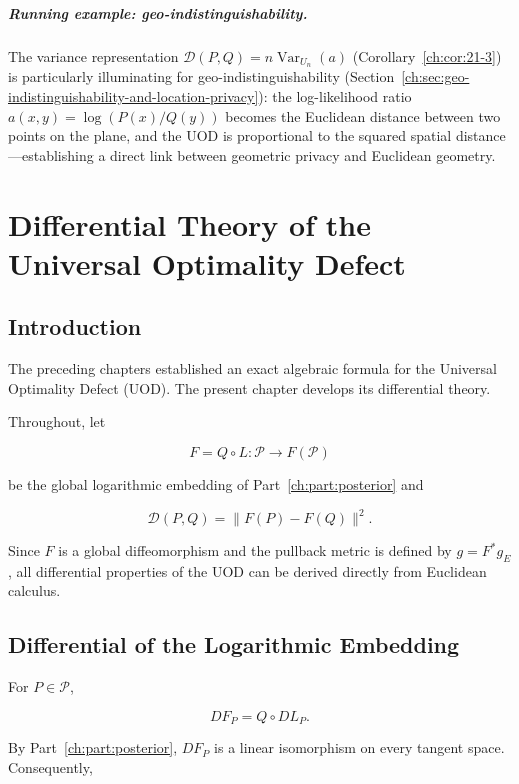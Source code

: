 \paragraph{Running example: geo-indistinguishability.}
The variance representation $\mathcal D(P,Q)=n\operatorname{Var}_{U_n}(a)$ (Corollary~\ref{ch:cor:21-3}) is particularly illuminating for geo-indistinguishability (Section~\ref{ch:sec:geo-indistinguishability-and-location-privacy}): the log-likelihood ratio $a(x,y)=\log(P(x)/Q(y))$ becomes the Euclidean distance between two points on the plane, and the UOD is proportional to the squared spatial distance---establishing a direct link between geometric privacy and Euclidean geometry.

\chapter[Differential Theory of the UOD]{Differential Theory of the Universal Optimality Defect}\label{ch:sec:differential-theory-of-the-universal-optimality-defect}

\section{Introduction}\label{ch:sec:introduction-analytic_uod-3}

The preceding chapters established an exact algebraic formula for the Universal
Optimality Defect (UOD). The present chapter develops its differential
theory.

Throughout, let

\[
F=Q\circ L:\mathcal P\rightarrow F(\mathcal P)
\]

be the global logarithmic embedding of Part~\ref{ch:part:posterior} and

\[
\mathcal D(P,Q)=\|F(P)-F(Q)\|^{2}.
\]

Since \(F\) is a global diffeomorphism and the pullback metric is defined
by \(g=F^{*}g_E\), all differential properties of the UOD can be derived
directly from Euclidean calculus.

\section{Differential of the Logarithmic Embedding}\label{ch:sec:differential-of-the-logarithmic-embedding}

For \(P\in\mathcal P\),

\[
DF_P=Q\circ DL_P.
\]

By Part~\ref{ch:part:posterior}, \(DF_P\) is a linear isomorphism on every tangent space.
Consequently,

